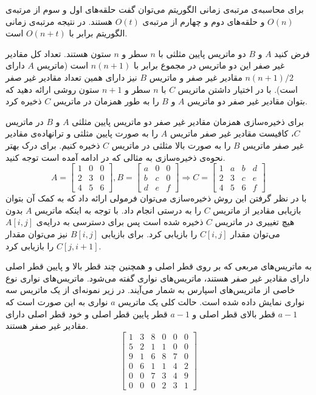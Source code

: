 برای محاسبه‌ی مرتبه‌ی زمانی الگوریتم {} می‌توان گفت حلقه‌های اول و سوم از مرتبه‌ی {$O(n)$} و حلقه‌های دوم و چهارم از مرتبه‌ی {$O(t)$} هستند. در نتیجه مرتبه‌ی زمانی الگوریتم {} برابر با {$O(n+t)$} است.


 فرض کنید {$A$} و {$B$} دو ماتریس پایین مثلثی با {$n$} سطر و {$n$} ستون هستند. تعداد کل مقادیر غیر صفر این دو ماتریس در مجموع برابر با {$n(n+1)$} است (ماتریس {$A$} دارای {$n(n+1)/2$} مقادیر غیر صفر و ماتریس {$B$} نیز دارای همین تعداد مقادیر غیر صفر است). با در اختیار داشتن ماتریس {$C$} با {$n$} سطر و  {$n+1$} ستون روشی ارائه دهید که بتوان مقادیر غیر صفر دو ماتریس {$A$} و {$B$} را به طور همزمان در ماتریس {$C$} ذخیره کرد.


برای ذخیره‌سازی همزمان مقادیر غیر صفر دو ماتریس پایین مثلثی {$A$} و {$B$} در ماتریس {$C$}، کافیست مقادیر غیر صفر ماتریس {$A$} را به صورت پایین مثلثی و ترانهاده‌ی مقادیر غیر صفر ماتریس {$B$} را به صورت بالا مثلثی در ماتریس {$C$} ذخیره کنیم. برای درک بهتر نحوه‌ی ذخیره‌سازی به مثالی که در ادامه آمده است توجه کنید.
\begin{displaymath}
A=
\begin{bmatrix}
1 & 0 & 0 \\
2 & 3 & 0 \\
4 & 5 & 6
\end{bmatrix},
B=
\begin{bmatrix}
a & 0 & 0 \\
b & c & 0 \\
d & e & f
\end{bmatrix}
\Rightarrow C=
\begin{bmatrix}
1 & a & b & d \\
2 & 3 & c & e \\
4 & 5 & 6 & f
\end{bmatrix}
\end{displaymath}
با در نظر گرفتن این روش ذخیره‌سازی می‌توان فرمولی ارائه داد که به کمک آن بتوان بازیابی مقادیر از ماتریس {$C$} را به درستی انجام داد. با توجه به اینکه ماتریس {$A$} بدون هیچ تغییری در ماتریس {$C$} ذخیره شده است پس برای دسترسی به درایه‌ی {$A[i,j]$} می‌توان مقدار {$C[i,j]$} را بازیابی کرد. برای بازیابی {$B[i,j]$} نیز می‌توان مقدار {$C[j,i+1]$} را بازیابی کرد.

 به ماتریس‌های مربعی که بر روی قطر اصلی و همچنین چند قطر بالا و پایین قطر اصلی دارای مقادیر غیر صفر هستند، ماتریس‌های نواری گفته می‌شود. ماتریس‌های نواری نوع خاصی از ماتریس‌های اسپارس به شمار می‌آیند. در زیر نمونه‌ای از یک ماتریس سه نواری نمایش داده شده است. حالت کلی یک ماتریس‌ {$a$} نواری به این صورت است که {$a-1$} قطر بالای قطر اصلی و {$a-1$} قطر پایین قطر اصلی و خود قطر اصلی دارای مقادیر غیر صفر هستند. 
$$
\begin{bmatrix}
1 & 3 & 8 & 0 & 0 & 0\\
5 & 2 & 1 & 1 & 0 & 0\\
9 & 1 & 6 & 8 & 7 & 0\\
0 & 6 & 1 & 1 & 4 & 2\\
0 & 0 & 7 & 3 & 4 & 9\\
0 & 0 & 0 & 2 & 3 & 1
\end{bmatrix}
$$

